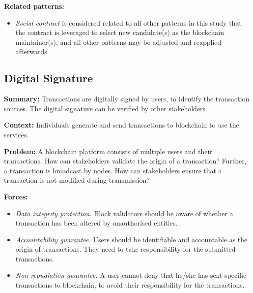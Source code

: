 \documentclass{article}
\begin{document}
\vspace{0.5em}\noindent \textbf{Related patterns:} 

\begin{itemize}
    \item \textit{Social contract} is considered related to all other patterns in this study that the contract is leveraged to select new candidate(s) as the blockchain maintainer(s), and all other patterns may be adjusted and reapplied afterwards.
\end{itemize}




\subsection{Digital Signature}

\vspace{0.5em}\noindent \textbf{Summary:} Transactions are digitally signed by users, to identify the transaction sources. The digital signature can be verified by other stakeholders.

\vspace{0.5em}\noindent \textbf{Context:} Individuals generate and send transactions to blockchain to use the services.

\vspace{0.5em}\noindent \textbf{Problem:} A blockchain platform consists of multiple users and their transactions. How can stakeholders validate the origin of a transaction? Further, a transaction is broadcast by nodes. How can stakeholders ensure that a transaction is not modified during transmission?



\vspace{0.5em}\noindent \textbf{Forces:} 

\begin{itemize}
  \item \textit{Data integrity protection.} Block validators should be aware of whether a transaction has been altered by unauthorised entities.

  
  \item \textit{Accountability guarantee.} Users should be identifiable and accountable as the origin of transactions. They need to take responsibility for the submitted transactions.
  
  \item \textit{Non-repudiation guarantee.} A user cannot deny that he/she has sent specific transactions to blockchain, to avoid their responsibility for the transactions.
\end{itemize}
\end{document}
